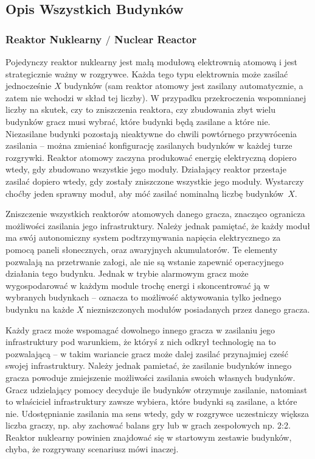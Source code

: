 \documentclass[11pt,a4paper]{article}
\begin{document}
\subsection{Opis Wszystkich Budynków}

\subsubsection{Reaktor Nuklearny $/$ Nuclear Reactor}

Pojedynczy reaktor nuklearny jest małą modułową elektrownią atomową i jest strategicznie ważny w rozgrywce. Każda tego typu elektrownia może zasilać jednocześnie $X$ budynków (sam reaktor atomowy jest zasilany automatycznie, a zatem nie wchodzi w skład tej liczby). W przypadku przekroczenia wspomnianej liczby na skutek, czy to zniszczenia reaktora, czy zbudowania zbyt wielu budynków gracz musi wybrać, które budynki będą zasilane a które nie. Niezasilane budynki pozostają nieaktywne do chwili powtórnego przywrócenia zasilania -- można zmieniać konfigurację zasilanych budynków w każdej turze rozgrywki. Reaktor atomowy zaczyna produkować energię elektryczną dopiero wtedy, gdy zbudowano wszystkie jego moduły. Działający reaktor przestaje zasilać dopiero wtedy, gdy zostały zniszczone wszystkie jego moduły. Wystarczy choćby jeden sprawny moduł, aby móć zasilać nominalną liczbę budynków~$X$.

Zniszczenie wszystkich reaktorów atomowych danego gracza, znacząco ogranicza możliwości zasilania jego infrastruktury. Należy jednak pamiętać, że każdy moduł ma swój autonomiczny system podtrzymywania napięcia elektrycznego za pomocą paneli słonecznych, oraz awaryjnych akumulatorów. Te elementy pozwalają na przetrwanie załogi, ale nie są wstanie zapewnić operacyjnego działania tego budynku. Jednak w trybie alarmowym gracz może wygospodarować w każdym module trochę energi i skoncentrować ją w wybranych budynkach -- oznacza to możliwość aktywowania tylko jednego budynku na każde $X$ niezniszczonych modułów posiadanych przez danego gracza.

Każdy gracz może wspomagać dowolnego innego gracza w zasilaniu jego infrastruktury pod warunkiem, że któryś z nich odkrył technologię na to pozwalającą -- w takim wariancie gracz może dalej zasilać przynajmiej cześć swojej infrastruktury. Należy jednak pamietać, że zasilanie budynków innego gracza powoduje zmiejszenie możliwości zasilania swoich własnych budynków. Gracz udzielający pomocy decyduje ile budynków otrzymuje zasilanie, natomiast to właściciel infrastruktury zawsze wybiera, które budynki są zasilane, a które nie. Udostępnianie zasilania ma sens wtedy, gdy w rozgrywce uczestniczy większa liczba graczy, np. aby zachować balans gry lub w grach zespołowych np. 2:2. Reaktor nuklearny powinien znajdować się w startowym zestawie budynków, chyba, że rozgrywany scenariusz mówi inaczej.
\end{document}
